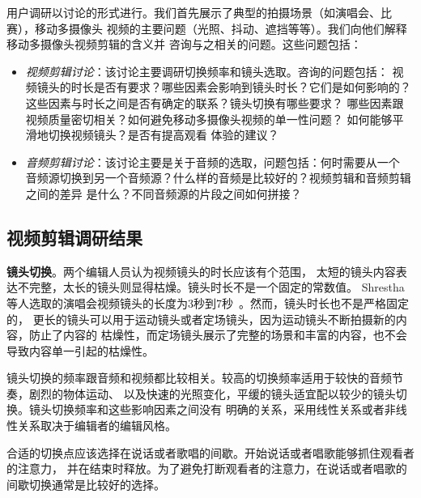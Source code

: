 \documentclass[doctor]{ustcthesis}
\begin{document}
用户调研以讨论的形式进行。我们首先展示了典型的拍摄场景（如演唱会、比赛），移动多摄像头
视频的主要问题（光照、抖动、遮挡等等）。我们向他们解释移动多摄像头视频剪辑的含义并
咨询与之相关的问题。这些问题包括：
\begin{itemize}\setlength{\itemsep}{0pt}
    \item \emph{视频剪辑讨论}：该讨论主要调研切换频率和镜头选取。咨询的问题包括：
        视频镜头的时长是否有要求？哪些因素会影响到镜头时长？它们是如何影响的？
        这些因素与时长之间是否有确定的联系？镜头切换有哪些要求？
        哪些因素跟视频质量密切相关？如何避免移动多摄像头视频的单一性问题？
        如何能够平滑地切换视频镜头？是否有提高观看
        体验的建议？
    \item \emph{音频剪辑讨论}：该讨论主要是关于音频的选取，问题包括：何时需要从一个
        音频源切换到另一个音频源？什么样的音频是比较好的？视频剪辑和音频剪辑之间的差异
        是什么？不同音频源的片段之间如何拼接？
\end{itemize}

\subsection{视频剪辑调研结果}
\label{sec:video-mashup-survey}
\textbf{镜头切换}。两个编辑人员认为视频镜头的时长应该有个范围，
太短的镜头内容表达不完整，太长的镜头则显得枯燥。镜头时长不是一个固定的常数值。
Shrestha等人选取的演唱会视频镜头的长度为3秒到7秒~\cite{shresthabws10}。然而，镜头时长也不是严格固定的，
更长的镜头可以用于运动镜头或者定场镜头，因为运动镜头不断拍摄新的内容，防止了内容的
枯燥性，而定场镜头展示了完整的场景和丰富的内容，也不会导致内容单一引起的枯燥性。

镜头切换的频率跟音频和视频都比较相关。较高的切换频率适用于较快的音频节奏，剧烈的物体运动、
以及快速的光照变化，平缓的镜头适宜配以较少的镜头切换。镜头切换频率和这些影响因素之间没有
明确的关系，采用线性关系或者非线性关系取决于编辑者的编辑风格。

合适的切换点应该选择在说话或者歌唱的间歇。开始说话或者唱歌能够抓住观看者的注意力，
并在结束时释放。为了避免打断观看者的注意力，在说话或者唱歌的间歇切换通常是比较好的选择。
\end{document}
